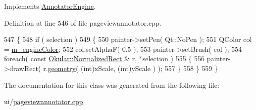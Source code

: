 Implements \hyperlink{classAnnotatorEngine_a71b2e9fcbcca36caadefa79adb99c93f}{Annotator\+Engine}.



Definition at line 546 of file pageviewannotator.\+cpp.


\begin{DoxyCode}
547         \{
548             \textcolor{keywordflow}{if} ( selection )
549             \{
550                 painter->setPen( Qt::NoPen );
551                 QColor col = \hyperlink{classAnnotatorEngine_a8911b0455be7eedfb2c102ce19acdce2}{m\_engineColor};
552                 col.setAlphaF( 0.5 );
553                 painter->setBrush( col );
554                 \textcolor{keywordflow}{foreach}( \textcolor{keyword}{const} \hyperlink{classOkular_1_1NormalizedRect}{Okular::NormalizedRect} & r, *selection )
555                 \{
556                     painter->drawRect( r.\hyperlink{classOkular_1_1NormalizedRect_a006897c5fcff2c3a97b4141f1a967513}{geometry}( (\textcolor{keywordtype}{int})xScale, (\textcolor{keywordtype}{int})yScale ) );
557                 \}
558             \}
559         \}
\end{DoxyCode}


The documentation for this class was generated from the following file\+:\begin{DoxyCompactItemize}
\item 
ui/\hyperlink{pageviewannotator_8cpp}{pageviewannotator.\+cpp}\end{DoxyCompactItemize}
